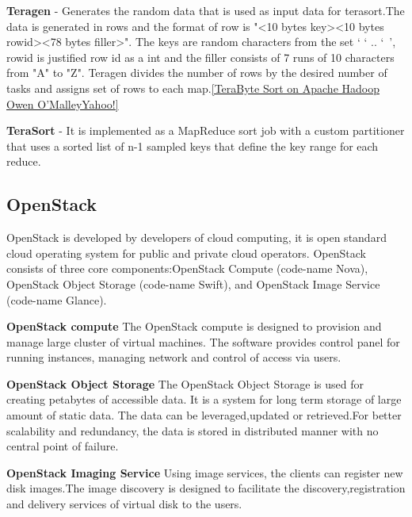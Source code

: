 \textbf{Teragen} - Generates the random data that is used as input data for terasort.The data is generated in rows and the format of 
row is "<10 bytes key><10 bytes rowid><78 bytes filler>". 
The keys are random characters from the set ‘ ‘ .. ‘~’, rowid is justified row id as a int and the filler consists of 7 runs of 10 characters from "A" to "Z". Teragen divides the number of rows by the desired number of tasks and assigns set of rows to each map.\ref{TeraByte Sort on Apache Hadoop Owen O’MalleyYahoo!}


\textbf{TeraSort} - It is implemented as a MapReduce sort job with a custom partitioner that uses a sorted list of n-1 sampled keys that define the key range for each reduce.







\subsection{OpenStack}

OpenStack is developed by developers of cloud computing, it is open standard cloud operating system for public and private cloud operators. OpenStack consists of three core components:OpenStack Compute (code-name Nova), OpenStack Object Storage (code-name Swift), and OpenStack Image Service (code-name Glance).


\textbf{OpenStack compute} The OpenStack compute is designed to provision and manage large cluster of virtual machines. The software provides control panel for running instances, managing network and control of access via users.
 
\textbf{OpenStack Object Storage} The OpenStack Object Storage is used for creating petabytes of accessible data. It is a system for long term storage of large amount of static data. The data can be leveraged,updated or retrieved.For better scalability and redundancy, the data is stored in distributed manner with no central point of failure.

\textbf{OpenStack Imaging Service} Using image services, the clients can register new disk images.The image discovery is designed to facilitate the discovery,registration and delivery services of virtual disk to the users.               
              
